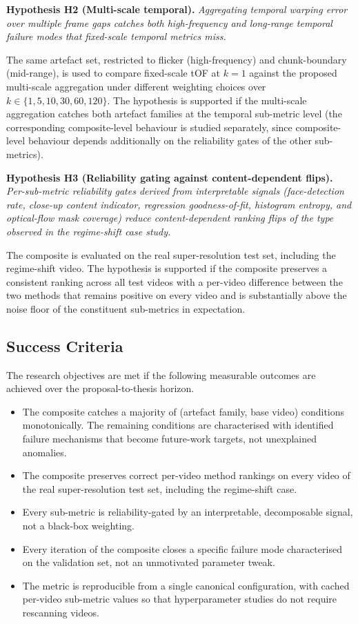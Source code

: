 \textbf{Hypothesis H2 (Multi-scale temporal).}
\textit{Aggregating temporal warping error over multiple frame gaps catches both
high-frequency and long-range temporal failure modes that fixed-scale temporal metrics
miss.}

The same artefact set, restricted to flicker (high-frequency) and chunk-boundary
(mid-range), is used to compare fixed-scale tOF at $k=1$ against the proposed multi-scale
aggregation under different weighting choices over $k \in \{1, 5, 10, 30, 60, 120\}$. The
hypothesis is supported if the multi-scale aggregation catches both artefact families at
the temporal sub-metric level (the corresponding composite-level behaviour is studied
separately, since composite-level behaviour depends additionally on the reliability gates of
the other sub-metrics).

\textbf{Hypothesis H3 (Reliability gating against content-dependent flips).}
\textit{Per-sub-metric reliability gates derived from interpretable signals (face-detection
rate, close-up content indicator, regression goodness-of-fit, histogram entropy, and
optical-flow mask coverage) reduce content-dependent ranking flips of the type observed in
the regime-shift case study.}

The composite is evaluated on the real super-resolution test set, including the
regime-shift video. The hypothesis is supported if the composite preserves a consistent
ranking across all test videos with a per-video difference between the two methods that
remains positive on every video and is substantially above the noise floor of the
constituent sub-metrics in expectation.

\subsection{Success Criteria}

The research objectives are met if the following measurable outcomes are achieved over the
proposal-to-thesis horizon.

\begin{itemize}
    \item The composite catches a majority of (artefact family, base video) conditions
          monotonically. The remaining conditions are characterised with identified failure
          mechanisms that become future-work targets, not unexplained anomalies.
    \item The composite preserves correct per-video method rankings on every video of the
          real super-resolution test set, including the regime-shift case.
    \item Every sub-metric is reliability-gated by an interpretable, decomposable signal,
          not a black-box weighting.
    \item Every iteration of the composite closes a specific failure mode characterised on
          the validation set, not an unmotivated parameter tweak.
    \item The metric is reproducible from a single canonical configuration, with cached
          per-video sub-metric values so that hyperparameter studies do not require
          rescanning videos.
\end{itemize}
